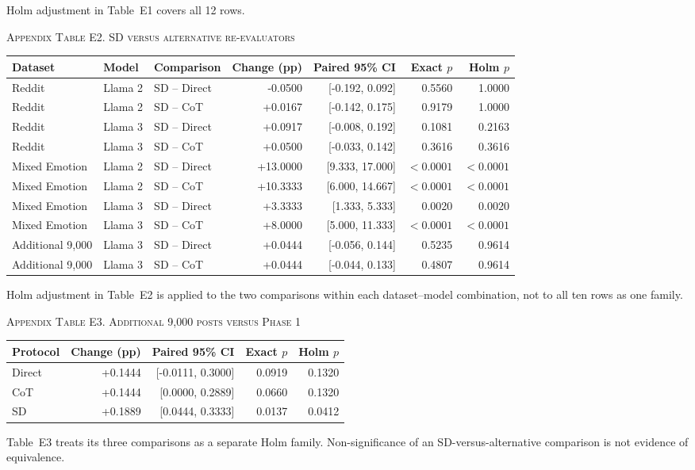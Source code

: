 \documentclass{ieeeaccess}
\begin{document}
Holm adjustment in Table~E1 covers all 12 rows.
\par\medskip\noindent\textsc{Appendix Table E2. SD versus alternative re-evaluators}\par\smallskip
{\small\renewcommand{\arraystretch}{1.15}\noindent\begin{tabular*}{\textwidth}{@{\extracolsep{\fill}}lllrrrr@{}}\toprule
Dataset & Model & Comparison & Change (pp) & Paired 95\% CI & Exact $p$ & Holm $p$ \\\midrule
Reddit & Llama 2 & SD -- Direct & -0.0500 & [-0.192, 0.092] & 0.5560 & 1.0000 \\
Reddit & Llama 2 & SD -- CoT & +0.0167 & [-0.142, 0.175] & 0.9179 & 1.0000 \\
Reddit & Llama 3 & SD -- Direct & +0.0917 & [-0.008, 0.192] & 0.1081 & 0.2163 \\
Reddit & Llama 3 & SD -- CoT & +0.0500 & [-0.033, 0.142] & 0.3616 & 0.3616 \\
Mixed Emotion & Llama 2 & SD -- Direct & +13.0000 & [9.333, 17.000] & $<0.0001$ & $<0.0001$ \\
Mixed Emotion & Llama 2 & SD -- CoT & +10.3333 & [6.000, 14.667] & $<0.0001$ & $<0.0001$ \\
Mixed Emotion & Llama 3 & SD -- Direct & +3.3333 & [1.333, 5.333] & 0.0020 & 0.0020 \\
Mixed Emotion & Llama 3 & SD -- CoT & +8.0000 & [5.000, 11.333] & $<0.0001$ & $<0.0001$ \\
Additional 9,000 & Llama 3 & SD -- Direct & +0.0444 & [-0.056, 0.144] & 0.5235 & 0.9614 \\
Additional 9,000 & Llama 3 & SD -- CoT & +0.0444 & [-0.044, 0.133] & 0.4807 & 0.9614 \\
\bottomrule\end{tabular*}}\par\medskip
Holm adjustment in Table~E2 is applied to the two comparisons within each dataset--model combination, not to all ten rows as one family.
\par\medskip\noindent\textsc{Appendix Table E3. Additional 9,000 posts versus Phase 1}\par\smallskip
{\small\renewcommand{\arraystretch}{1.15}\noindent\begin{tabular*}{\textwidth}{@{\extracolsep{\fill}}lrrrr@{}}\toprule
Protocol & Change (pp) & Paired 95\% CI & Exact $p$ & Holm $p$ \\\midrule
Direct & +0.1444 & [-0.0111, 0.3000] & 0.0919 & 0.1320 \\
CoT & +0.1444 & [0.0000, 0.2889] & 0.0660 & 0.1320 \\
SD & +0.1889 & [0.0444, 0.3333] & 0.0137 & 0.0412 \\
\bottomrule\end{tabular*}}\par\medskip
Table~E3 treats its three comparisons as a separate Holm family. Non-significance of an SD-versus-alternative comparison is not evidence of equivalence.
\end{document}
